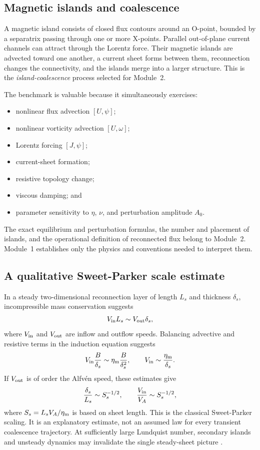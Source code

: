 \documentclass[11pt]{article}
\begin{document}
\subsection{Magnetic islands and coalescence}

A magnetic island consists of closed flux contours around an O-point, bounded by a separatrix passing through one or more X-points. Parallel out-of-plane current channels can attract through the Lorentz force. Their magnetic islands are advected toward one another, a current sheet forms between them, reconnection changes the connectivity, and the islands merge into a larger structure. This is the \emph{island-coalescence} process selected for Module~2.

The benchmark is valuable because it simultaneously exercises:
\begin{itemize}
  \item nonlinear flux advection $[U,\psi]$;
  \item nonlinear vorticity advection $[U,\omega]$;
  \item Lorentz forcing $[J,\psi]$;
  \item current-sheet formation;
  \item resistive topology change;
  \item viscous damping; and
  \item parameter sensitivity to $\eta$, $\nu$, and perturbation amplitude $A_0$.
\end{itemize}

The exact equilibrium and perturbation formulas, the number and placement of islands, and the operational definition of reconnected flux belong to Module~2. Module~1 establishes only the physics and conventions needed to interpret them.

\subsection{A qualitative Sweet-Parker scale estimate}

In a steady two-dimensional reconnection layer of length $L_s$ and thickness $\delta_s$, incompressible mass conservation suggests
\begin{equation}
V_{\rm in}L_s\sim V_{\rm out}\delta_s,
\end{equation}
where $V_{\rm in}$ and $V_{\rm out}$ are inflow and outflow speeds. Balancing advective and resistive terms in the induction equation suggests
\begin{equation}
V_{\rm in}\frac{B}{\delta_s}
\sim
\eta_{\rm m}\frac{B}{\delta_s^2},
\qquad
V_{\rm in}\sim\frac{\eta_{\rm m}}{\delta_s}.
\end{equation}
If $V_{\rm out}$ is of order the Alfv\'en speed, these estimates give
\begin{equation}
\frac{\delta_s}{L_s}\sim S_s^{-1/2},
\qquad
\frac{V_{\rm in}}{V_A}\sim S_s^{-1/2},
\end{equation}
where $S_s=L_sV_A/\eta_{\rm m}$ is based on sheet length. This is the classical Sweet-Parker scaling. It is an explanatory estimate, not an assumed law for every transient coalescence trajectory. At sufficiently large Lundquist number, secondary islands and unsteady dynamics may invalidate the single steady-sheet picture \cite{Goedbloed2010}.
\end{document}
